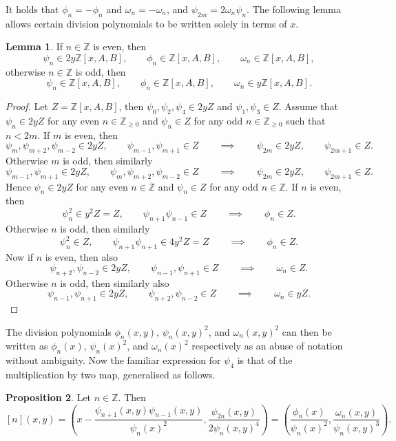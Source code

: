 \documentclass{article}
\newcommand{\Z}{\mathbb{Z}}
\newcommand{\rb}[1]{\left( #1 \right)}
\renewcommand{\sb}[1]{\left[ #1 \right]}
\theoremstyle{definition}\newtheorem*{definition}{Definition}
\theoremstyle{definition}\newtheorem*{example}{Example}
\theoremstyle{definition}\newtheorem*{remark}{Remark}
\newtheorem{proposition}{Proposition}[subsection]
\newtheorem{lemma}[proposition]{Lemma}
\begin{document}
It holds that $ \phi_n = -\phi_n $ and $ \omega_n = -\omega_n $, and $ \psi_{2m} = 2\omega_n\psi_n $. The following lemma allows certain division polynomials to be written solely in terms of $ x $.

\begin{lemma}
If $ n \in \Z $ is even, then
$$ \psi_n \in 2y\Z\sb{x, A, B}, \qquad \phi_n \in \Z\sb{x, A, B}, \qquad \omega_n \in \Z\sb{x, A, B}, $$
otherwise $ n \in \Z $ is odd, then
$$ \psi_n \in \Z\sb{x, A, B}, \qquad \phi_n \in \Z\sb{x, A, B}, \qquad \omega_n \in y\Z\sb{x, A, B}. $$
\end{lemma}

\begin{proof}
Let $ Z = \Z\sb{x, A, B} $, then $ \psi_0, \psi_2, \psi_4 \in 2yZ $ and $ \psi_1, \psi_3 \in Z $. Assume that $ \psi_n \in 2yZ $ for any even $ n \in \Z_{\ge 0} $ and $ \psi_n \in Z $ for any odd $ n \in \Z_{\ge 0} $ such that $ n < 2m $. If $ m $ is even, then
$$ \psi_m, \psi_{m + 2}, \psi_{m - 2} \in 2yZ, \qquad \psi_{m - 1}, \psi_{m + 1} \in Z \qquad \implies \qquad \psi_{2m} \in 2yZ, \qquad \psi_{2m + 1} \in Z. $$
Otherwise $ m $ is odd, then similarly
$$ \psi_{m - 1}, \psi_{m + 1} \in 2yZ, \qquad \psi_m, \psi_{m + 2}, \psi_{m - 2} \in Z \qquad \implies \qquad \psi_{2m} \in 2yZ, \qquad \psi_{2m + 1} \in Z. $$
Hence $ \psi_n \in 2yZ $ for any even $ n \in \Z $ and $ \psi_n \in Z $ for any odd $ n \in \Z $. If $ n $ is even, then
$$ \psi_n^2 \in y^2Z = Z, \qquad \psi_{n + 1}\psi_{n - 1} \in Z \qquad \implies \qquad \phi_n \in Z. $$
Otherwise $ n $ is odd, then similarly
$$ \psi_n^2 \in Z, \qquad \psi_{n + 1}\psi_{n + 1} \in 4y^2Z = Z \qquad \implies \qquad \phi_n \in Z. $$
Now if $ n $ is even, then also
$$ \psi_{n + 2}, \psi_{n - 2} \in 2yZ, \qquad \psi_{n - 1}, \psi_{n + 1} \in Z \qquad \implies \qquad \omega_n \in Z. $$
Otherwise $ n $ is odd, then similarly also
$$ \psi_{n - 1}, \psi_{n + 1} \in 2yZ, \qquad \psi_{n + 2}, \psi_{n - 2} \in Z \qquad \implies \qquad \omega_n \in yZ. $$
\end{proof}

The division polynomials $ \phi_n\rb{x, y} $, $ \psi_n\rb{x, y}^2 $, and $ \omega_n\rb{x, y}^2 $ can then be written as $ \phi_n\rb{x} $, $ \psi_n\rb{x}^2 $, and $ \omega_n\rb{x}^2 $ respectively as an abuse of notation without ambiguity. Now the familiar expression for $ \psi_4 $ is that of the multiplication by two map, generalised as follows.

\begin{proposition}
Let $ n \in \Z $. Then
$$ \sb{n}\rb{x, y} = \rb{x - \dfrac{\psi_{n + 1}\rb{x, y}\psi_{n - 1}\rb{x, y}}{\psi_n\rb{x}^2}, \dfrac{\psi_{2n}\rb{x, y}}{2\psi_n\rb{x, y}^4}} = \rb{\dfrac{\phi_n\rb{x}}{\psi_n\rb{x}^2}, \dfrac{\omega_n\rb{x, y}}{\psi_n\rb{x, y}^3}}. $$
\end{proposition}
\end{document}
